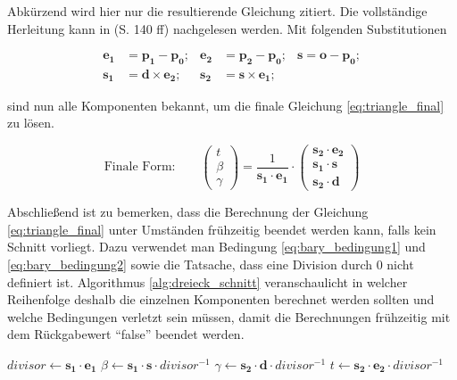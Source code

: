 Abkürzend wird hier nur die resultierende Gleichung zitiert. Die vollständige Herleitung kann in \cite{pharrhumphrey2010Physically} (S. 140 ff) nachgelesen werden.
Mit folgenden Substitutionen

\begin{align*}
    \boldsymbol{e_1} &= \boldsymbol{p_1} - \boldsymbol{p_0};  & \boldsymbol{e_2} &= \boldsymbol{p_2} - \boldsymbol{p_0}; & \boldsymbol{s} = \boldsymbol{o} - \boldsymbol{p_0};\\
    \boldsymbol{s_1} &= \boldsymbol{d} \times \boldsymbol{e_2};   &  \boldsymbol{s_2} &= \boldsymbol{s} \times \boldsymbol{e_1}; &
\end{align*}

sind nun alle Komponenten bekannt, um die finale Gleichung \ref{eq:triangle_final} zu lösen.

\begin{equation}
    \label{eq:triangle_final}
    \text{Finale Form:} \qquad \begin{pmatrix} t \\ \beta \\ \gamma \end{pmatrix} = \frac{1}{\boldsymbol{s_1} \cdot \boldsymbol{e_1} } \cdot
    \begin{pmatrix}
        \boldsymbol{s_2} \cdot \boldsymbol{e_2} \\ \boldsymbol{s_1} \cdot \boldsymbol{s} \\ \boldsymbol{s_2} \cdot \boldsymbol{d}
    \end{pmatrix} 
\end{equation}

Abschließend ist zu bemerken, dass die Berechnung der Gleichung \ref{eq:triangle_final} unter Umständen frühzeitig beendet werden kann, falls kein Schnitt vorliegt. Dazu
verwendet man Bedingung \ref{eq:bary_bedingung1} und \ref{eq:bary_bedingung2} sowie die Tatsache, dass eine Division durch 0 nicht definiert ist.
Algorithmus \ref{alg:dreieck_schnitt} veranschaulicht in welcher Reihenfolge deshalb die einzelnen Komponenten berechnet werden sollten und welche Bedingungen verletzt sein müssen, damit die Berechnungen frühzeitig mit dem Rückgabewert "`false"' beendet werden.

\begin{algorithm}[H]
    \caption{Dreieck Schnitttest}
    \label{alg:dreieck_schnitt}
    \begin{algorithmic}[1]
        \State \(divisor \gets \boldsymbol{s_1} \cdot \boldsymbol{e_1}\)
            \State{}
        \EndIf
        \State \( \beta \gets \boldsymbol{s_1} \cdot \boldsymbol{s} \cdot divisor^{-1} \)
            \State{}
        \EndIf
        \State \( \gamma \gets \boldsymbol{s_2} \cdot \boldsymbol{d} \cdot divisor^{-1} \)
            \State{}
        \EndIf
        \State \( t \gets \boldsymbol{s_2} \cdot \boldsymbol{e_2} \cdot divisor^{-1} \)
        \State{}   
    \end{algorithmic}
\end{algorithm}


